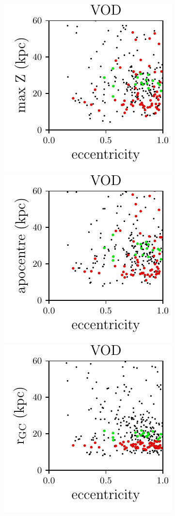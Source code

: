 \documentclass[fleqn,usenatbib]{mnras}
\begin{document}
\begin{figure}
	\includegraphics[scale=0.472]{VOD_orbits_ecc_z.pdf}
    \includegraphics[scale=0.472]{VOD_orbits_apo_ecc.pdf} 
  \includegraphics[scale=0.472]{VOD_orbits_ecc_r.pdf} \\

\end{figure}
\end{document}
